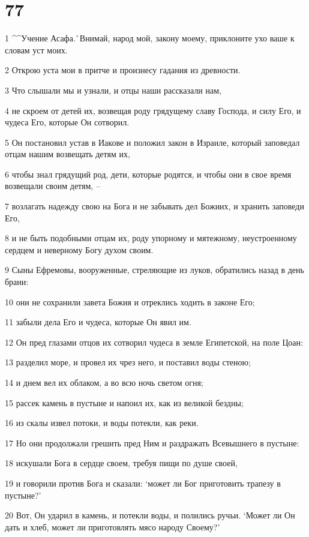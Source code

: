 \chapter{77}

\par 1 ^^Учение Асафа.^^ Внимай, народ мой, закону моему, приклоните ухо ваше к словам уст моих.
\par 2 Открою уста мои в притче и произнесу гадания из древности.
\par 3 Что слышали мы и узнали, и отцы наши рассказали нам,
\par 4 не скроем от детей их, возвещая роду грядущему славу Господа, и силу Его, и чудеса Его, которые Он сотворил.
\par 5 Он постановил устав в Иакове и положил закон в Израиле, который заповедал отцам нашим возвещать детям их,
\par 6 чтобы знал грядущий род, дети, которые родятся, и чтобы они в свое время возвещали своим детям, --
\par 7 возлагать надежду свою на Бога и не забывать дел Божиих, и хранить заповеди Его,
\par 8 и не быть подобными отцам их, роду упорному и мятежному, неустроенному сердцем и неверному Богу духом своим.
\par 9 Сыны Ефремовы, вооруженные, стреляющие из луков, обратились назад в день брани:
\par 10 они не сохранили завета Божия и отреклись ходить в законе Его;
\par 11 забыли дела Его и чудеса, которые Он явил им.
\par 12 Он пред глазами отцов их сотворил чудеса в земле Египетской, на поле Цоан:
\par 13 разделил море, и провел их чрез него, и поставил воды стеною;
\par 14 и днем вел их облаком, а во всю ночь светом огня;
\par 15 рассек камень в пустыне и напоил их, как из великой бездны;
\par 16 из скалы извел потоки, и воды потекли, как реки.
\par 17 Но они продолжали грешить пред Ним и раздражать Всевышнего в пустыне:
\par 18 искушали Бога в сердце своем, требуя пищи по душе своей,
\par 19 и говорили против Бога и сказали: `может ли Бог приготовить трапезу в пустыне?'
\par 20 Вот, Он ударил в камень, и потекли воды, и полились ручьи. `Может ли Он дать и хлеб, может ли приготовлять мясо народу Своему?'
